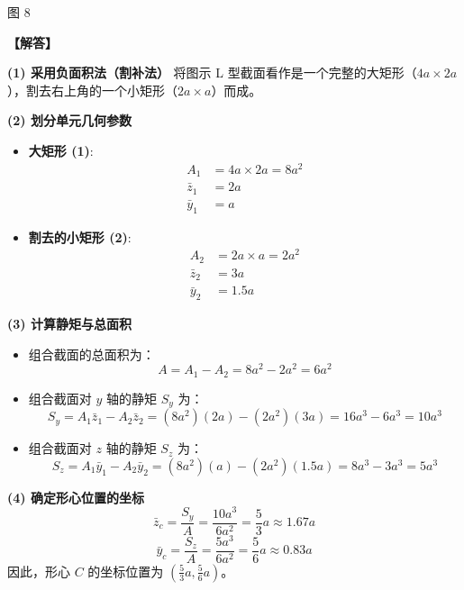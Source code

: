 \documentclass[11pt,a4paper]{ctexrep}
\begin{document}
{\begin{enumerate}
\begin{center}
\par\small 图 8
\end{center}

\textbf{【解答】}

\textbf{(1) 采用负面积法（割补法）}
将图示 L 型截面看作是一个完整的大矩形（$4a \times 2a$），割去右上角的一个小矩形（$2a \times a$）而成。

\textbf{(2) 划分单元几何参数}
\begin{itemize}
    \item \textbf{大矩形 (1)}: 
    \begin{align*}
    A_1 &= 4a \times 2a = 8a^2 \\
    \bar{z}_1 &= 2a \\
    \bar{y}_1 &= a
    \end{align*}
    \item \textbf{割去的小矩形 (2)}: 
    \begin{align*}
    A_2 &= 2a \times a = 2a^2 \\
    \bar{z}_2 &= 3a \\
    \bar{y}_2 &= 1.5a
    \end{align*}
\end{itemize}

\textbf{(3) 计算静矩与总面积}
\begin{itemize}
    \item 组合截面的总面积为：
    \[
    A = A_1 - A_2 = 8a^2 - 2a^2 = 6a^2
    \]
    \item 组合截面对 $y$ 轴的静矩 $S_y$ 为：
    \[
    S_y = A_1 \bar{z}_1 - A_2 \bar{z}_2 = (8a^2)(2a) - (2a^2)(3a) = 16a^3 - 6a^3 = 10a^3
    \]
    \item 组合截面对 $z$ 轴的静矩 $S_z$ 为：
    \[
    S_z = A_1 \bar{y}_1 - A_2 \bar{y}_2 = (8a^2)(a) - (2a^2)(1.5a) = 8a^3 - 3a^3 = 5a^3
    \]
\end{itemize}

\textbf{(4) 确定形心位置的坐标}
\[
\bar{z}_c = \frac{S_y}{A} = \frac{10a^3}{6a^2} = \frac{5}{3}a \approx 1.67a
\]
\[
\bar{y}_c = \frac{S_z}{A} = \frac{5a^3}{6a^2} = \frac{5}{6}a \approx 0.83a
\]
因此，形心 $C$ 的坐标位置为 $\left(\frac{5}{3}a, \frac{5}{6}a\right)$。
\end{enumerate}


}
\end{document}
